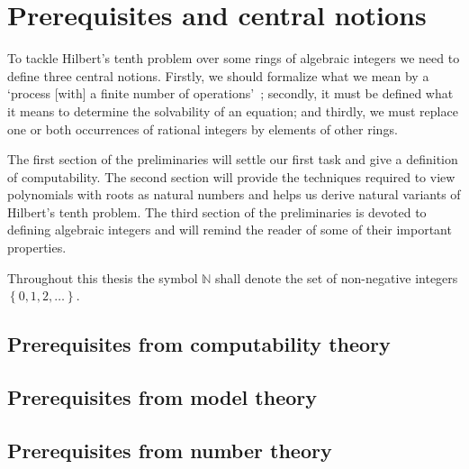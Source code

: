 \documentclass[12pt,a4paper]{scrbook}
\numberwithin{equation}{section}
\newcommand{\set}[1]{\left\lbrace #1 \right\rbrace}
\begin{document}

\allowdisplaybreaks

\frontmatter



\mainmatter

\chapter{Prerequisites and central notions}

To tackle Hilbert's tenth problem over some rings of algebraic integers we need
to define three central notions. Firstly, we should formalize what we mean by a
‘process [with] a finite number of operations’~\cite{Hilbert1900}; secondly, it
must be defined what it means to determine the solvability of an equation; and
thirdly, we must replace one or both occurrences of rational integers by
elements of other rings.

The first section of the preliminaries will settle our first task and give a
definition of computability. The second section will provide the techniques
required to view polynomials with roots as natural numbers and helps us derive
natural variants of Hilbert's tenth problem. The third section of the
preliminaries is devoted to defining algebraic integers and will remind the
reader of some of their important properties.

Throughout this thesis the symbol \(ℕ\) shall denote the set of non-negative
integers \(\set{0, 1, 2, …}\).

\section{Prerequisites from computability theory}


\section{Prerequisites from model theory}


\section{Prerequisites from number theory}\label{sec:number theory}

\end{document}
